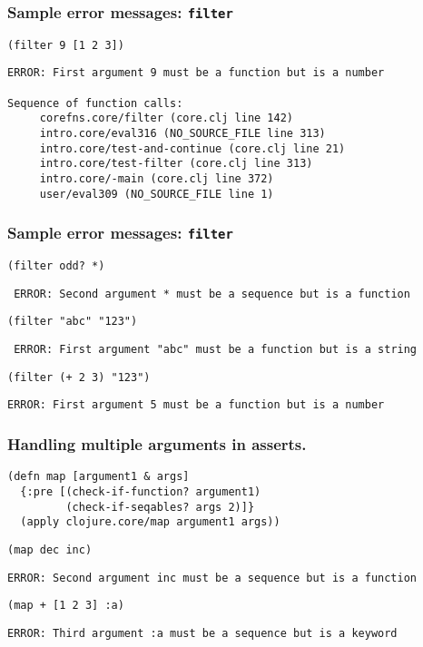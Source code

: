 \documentclass{beamer}
\begin{document}
\begin{frame}[fragile]
  \frametitle{Sample error messages: {\tt filter}}
{\tt (filter 9 [1 2 3])}

\begin{verbatim}
ERROR: First argument 9 must be a function but is a number

Sequence of function calls:
     corefns.core/filter (core.clj line 142)
     intro.core/eval316 (NO_SOURCE_FILE line 313)
     intro.core/test-and-continue (core.clj line 21)
     intro.core/test-filter (core.clj line 313)
     intro.core/-main (core.clj line 372)
     user/eval309 (NO_SOURCE_FILE line 1)
\end{verbatim}
\end{frame}

\begin{frame}[fragile]
  \frametitle{Sample error messages: {\tt filter}}
{\tt (filter odd? *)}

{\tt 
ERROR: Second argument * must be a sequence but is a function
}

{\tt (filter "abc" "123")}

{\tt 
ERROR: First argument "abc" must be a function but is a string}

{\tt (filter (+ 2 3) "123")}

{\tt ERROR: First argument 5 must be a function but is a number}

\end{frame}

\begin{frame}[fragile]
  \frametitle{Handling multiple arguments in asserts.}
\begin{verbatim}
(defn map [argument1 & args]
  {:pre [(check-if-function? argument1) 
         (check-if-seqables? args 2)]}
  (apply clojure.core/map argument1 args))
\end{verbatim}

{\tt (map dec inc)}

{\tt ERROR: Second argument inc must be a sequence but is a function}

{\tt (map + [1 2 3] :a)}

{\tt ERROR: Third argument :a must be a sequence but is a keyword}
\end{frame}
\end{document}
